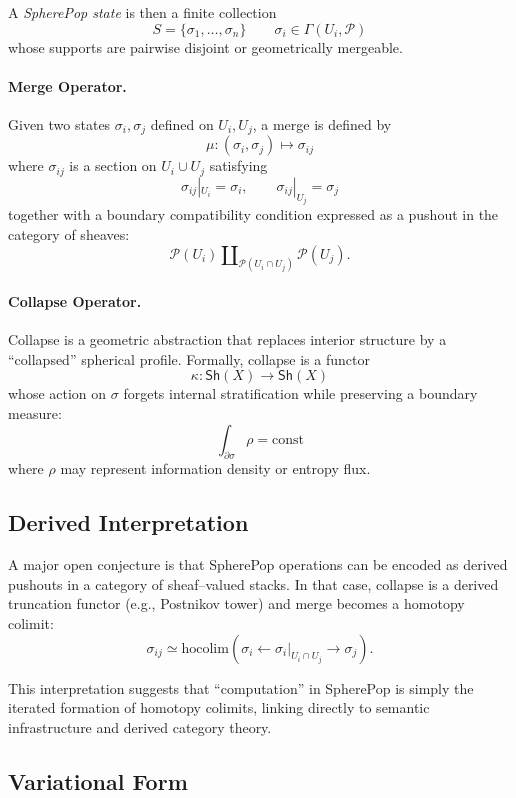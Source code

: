 \documentclass[12pt]{article}
\theoremstyle{plain}
\theoremstyle{definition}
\theoremstyle{remark}
\begin{document}
A \emph{SpherePop state} is then a finite collection
\[
    S = \{\sigma_1,\dots,\sigma_n\} \qquad \sigma_i \in \Gamma(U_i,\mathcal{P})
\]
whose supports are pairwise disjoint or geometrically mergeable.

\paragraph{Merge Operator.}
Given two states $\sigma_i,\sigma_j$ defined on $U_i,U_j$, a merge is defined by
\[
    \mu : (\sigma_i,\sigma_j) \mapsto \sigma_{ij}
\]
where $\sigma_{ij}$ is a section on $U_i \cup U_j$ satisfying
\[
    \sigma_{ij}|_{U_i}=\sigma_i,\qquad
    \sigma_{ij}|_{U_j}=\sigma_j
\]
together with a boundary compatibility condition expressed as a pushout in the
category of sheaves:
\[
    \mathcal{P}(U_i) \amalg_{\mathcal{P}(U_i\cap U_j)} \mathcal{P}(U_j).
\]


\paragraph{Collapse Operator.}
Collapse is a geometric abstraction that replaces interior structure by a
``collapsed'' spherical profile. Formally, collapse is a functor
\[
    \kappa : \mathsf{Sh}(X) \to \mathsf{Sh}(X)
\]
whose action on $\sigma$ forgets internal stratification while preserving a
boundary measure:
\[
    \int_{\partial \sigma} \rho = \mathrm{const}
\]
where $\rho$ may represent information density or entropy flux.


\subsection{Derived Interpretation}

A major open conjecture is that SpherePop operations can be encoded as derived
pushouts in a category of sheaf--valued stacks. In that case, collapse is a
derived truncation functor (e.g., Postnikov tower) and merge becomes a homotopy
colimit:
\[
    \sigma_{ij} \simeq \mathrm{hocolim}\left(
    \sigma_i \leftarrow \sigma_i|_{U_i\cap U_j} \to \sigma_j\right).
\]

This interpretation suggests that ``computation'' in SpherePop is simply the
iterated formation of homotopy colimits, linking directly to semantic
infrastructure and derived category theory.


\subsection{Variational Form}
\end{document}
